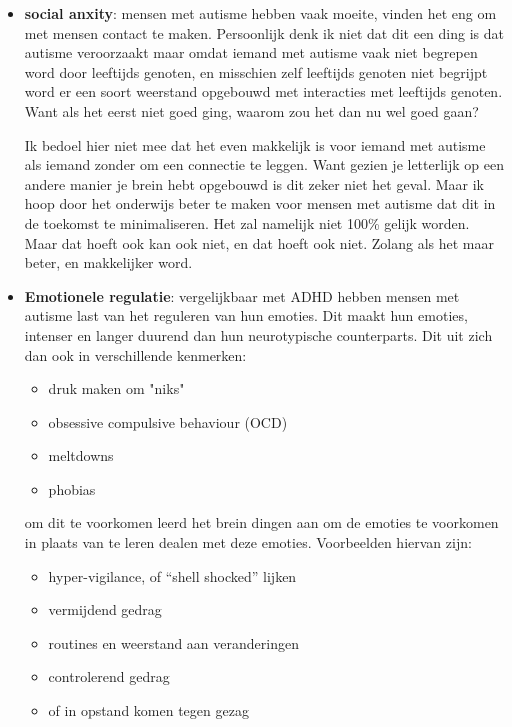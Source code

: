                     \begin{itemize}
                        \item \textbf{social anxity}: 
                            mensen met autisme hebben vaak moeite, vinden het eng om met mensen contact te maken. Persoonlijk denk ik niet dat dit een ding is dat autisme veroorzaakt maar omdat iemand met autisme vaak niet begrepen word door leeftijds genoten, en misschien zelf leeftijds genoten niet begrijpt word er een soort weerstand opgebouwd met interacties met leeftijds genoten. Want als het eerst niet goed ging, waarom zou het dan nu wel goed gaan?

                            \smallskip

                            Ik bedoel hier niet mee dat het even makkelijk is voor iemand met autisme als iemand zonder om een connectie te leggen. Want gezien je letterlijk op een andere manier je brein hebt opgebouwd is dit zeker niet het geval. Maar ik hoop door het onderwijs beter te maken voor mensen met autisme dat dit in de toekomst te minimaliseren. Het zal namelijk niet 100\% gelijk worden. Maar dat hoeft ook kan ook niet, en dat hoeft ook niet. Zolang als het maar beter, en makkelijker word.
                        
                        \item \textbf{Emotionele regulatie}: 
                            vergelijkbaar met ADHD hebben mensen met autisme last van het reguleren van hun emoties. Dit maakt hun emoties, intenser en langer duurend dan hun neurotypische counterparts. Dit uit zich dan ook in verschillende kenmerken:

                            \begin{itemize}
                                \item druk maken om "niks"
                                \item obsessive compulsive behaviour (OCD)
                                \item meltdowns
                                \item phobias
                            \end{itemize}

                            om dit te voorkomen leerd het brein dingen aan om de emoties te voorkomen in plaats van te leren dealen met deze emoties. Voorbeelden hiervan zijn:

                            \begin{itemize}
                                \item hyper-vigilance, of “shell shocked” lijken
                                \item vermijdend gedrag
                                \item routines en weerstand aan veranderingen
                                \item controlerend gedrag
                                \item of in opstand komen tegen gezag
                            \end{itemize}


\end{itemize}
